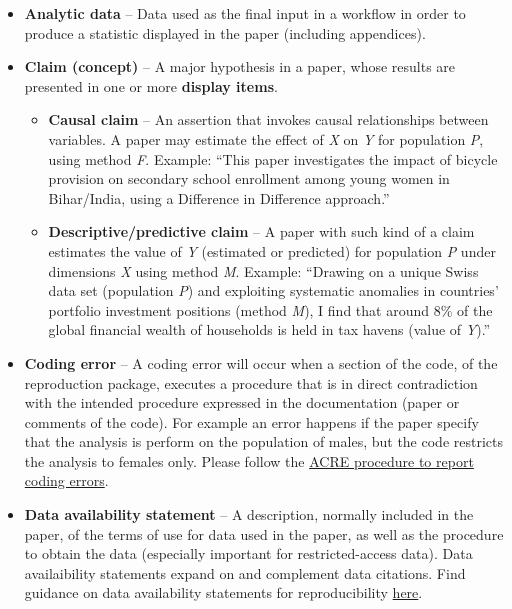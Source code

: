 \documentclass[
]{book}
\providecommand{\tightlist}{%
  \setlength{\itemsep}{0pt}\setlength{\parskip}{0pt}}
\begin{document}
\begin{itemize}
\tightlist
\item
  \textbf{Analytic data} -- Data used as the final input in a workflow in order to produce a statistic displayed in the paper (including appendices).\\
\item
  \textbf{Claim (concept)} -- A major hypothesis in a paper, whose results are presented in one or more \textbf{display items}.

  \begin{itemize}
  \tightlist
  \item
    \textbf{Causal claim} -- An assertion that invokes causal relationships between variables. A paper may estimate the effect of \emph{X} on \emph{Y} for population \emph{P}, using method \emph{F}. Example: ``This paper investigates the impact of bicycle provision on secondary school enrollment among young women in Bihar/India, using a Difference in Difference approach.''\\
  \item
    \textbf{Descriptive/predictive claim} -- A paper with such kind of a claim estimates the value of \emph{Y} (estimated or predicted) for population \emph{P} under dimensions \emph{X} using method \emph{M}. Example: ``Drawing on a unique Swiss data set (population \emph{P}) and exploiting systematic anomalies in countries' portfolio investment positions (method \emph{M}), I find that around 8\% of the global financial wealth of households is held in tax havens (value of \emph{Y}).''\\
  \end{itemize}
\item
  \textbf{Coding error} -- A coding error will occur when a section of the code, of the reproduction package, executes a procedure that is in direct contradiction with the intended procedure expressed in the documentation (paper or comments of the code). For example an error happens if the paper specify that the analysis is perform on the population of males, but the code restricts the analysis to females only. Please follow the \href{ADD\%20LINK}{ACRE procedure to report coding errors}.
\item
  \textbf{Data availability statement} -- A description, normally included in the paper, of the terms of use for data used in the paper, as well as the procedure to obtain the data (especially important for restricted-access data). Data availaibility statements expand on and complement data citations. Find guidance on data availability statements for reproducibility \href{https://social-science-data-editors.github.io/guidance/Requested_information_dcas.html\#what-are-data-and-code-availability-statements-dcas}{here}.\\

\end{itemize}
\end{document}
